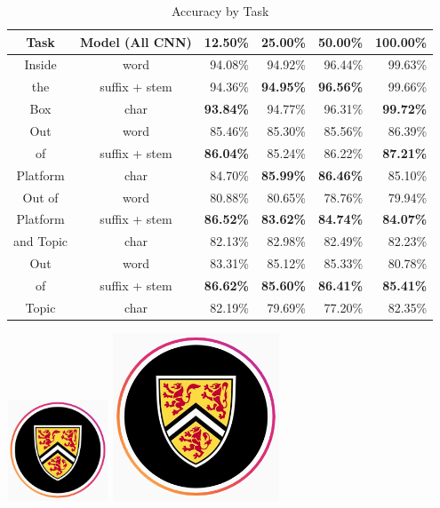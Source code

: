 \documentclass[17pt]{beamer}
\begin{document}
\begin{frame}
	\begin{table}[htbp]
		\caption*{Accuracy by Task}
		\scriptsize
		\begin{tabular}{c|c|r|r|r|r}
			Task & Model (All CNN) & 12.50\% & 25.00\% & 50.00\% & 100.00\% \\ 
			\midrule
			Inside & word & 94.08\% & 94.92\% & 96.44\% & 99.63\% \\ 
			the & suffix + stem & 94.36\% & \textbf{94.95\%} & \textbf{96.56\%} & 99.66\% \\ 
			Box & char & \textbf{93.84\%} & 94.77\% & 96.31\% & \textbf{99.72\%} \\ 
			\midrule
			Out & word & 85.46\% & 85.30\% & 85.56\% & 86.39\% \\ 
			of & suffix + stem & \textbf{86.04\%} & 85.24\% & 86.22\% & \textbf{87.21\%} \\ 
			Platform & char & 84.70\% & \textbf{85.99\%} & \textbf{86.46\%} & 85.10\% \\ 
			\midrule
			Out of  & word & 80.88\% & 80.65\% & 78.76\% & 79.94\% \\ 
			Platform & suffix + stem & \textbf{86.52\%} & \textbf{83.62\%} & \textbf{84.74\%} & \textbf{84.07\%} \\ 
			and Topic & char & 82.13\% & 82.98\% & 82.49\% & 82.23\% \\ 
			\midrule
			Out & word & 83.31\% & 85.12\% & 85.33\% & 80.78\% \\ 
			of & suffix + stem & \textbf{86.62\%} & \textbf{85.60\%} & \textbf{86.41\%} & \textbf{85.41\%} \\ 
			Topic & char & 82.19\% & 79.69\% & 77.20\% & 82.35\% \\ 
			\midrule
		\end{tabular}
		\label{}
	\end{table}
	
\end{frame}
\begin{frame}
	\includegraphics[height=3cm,width=3cm]{uwaterloo_logo.png}
	\includegraphics[height=5cm,width=5cm]{uwaterloo_logo.png}
\end{frame}
\end{document}
